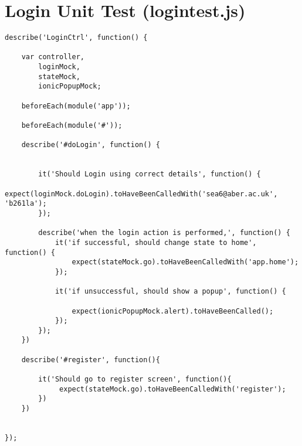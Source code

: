 \section{Login Unit Test (logintest.js)}
\begin{verbatim}
describe('LoginCtrl', function() {

    var controller, 
        loginMock,
        stateMock,
        ionicPopupMock;
    
    beforeEach(module('app'));

    beforeEach(module('#'));  

    describe('#doLogin', function() {


        it('Should Login using correct details', function() {
            expect(loginMock.doLogin).toHaveBeenCalledWith('sea6@aber.ac.uk', 'b261la'); 
        });

        describe('when the login action is performed,', function() {
            it('if successful, should change state to home', function() {
                expect(stateMock.go).toHaveBeenCalledWith('app.home');
            });

            it('if unsuccessful, should show a popup', function() {

                expect(ionicPopupMock.alert).toHaveBeenCalled();
            });
        });
    })

    describe('#register', function(){

        it('Should go to register screen', function(){
             expect(stateMock.go).toHaveBeenCalledWith('register');
        })
    })


});
\end{verbatim}


